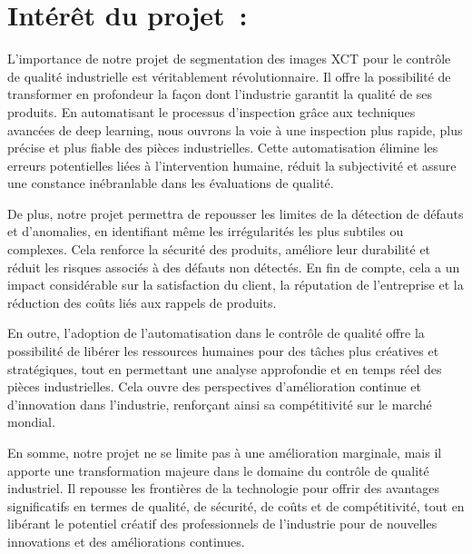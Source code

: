 \documentclass{report}
\newenvironment{mystyle}{
	\setlength{\parindent}{0pt} %
	\setlength{\parskip}{10pt} %
	\fontsize{12pt}{14pt}\selectfont %
}{
}
\begin{document}
		\section{Intérêt du projet :}
		\begin{mystyle}
			L'importance de notre projet de segmentation des images XCT pour le contrôle de qualité industrielle est véritablement révolutionnaire. Il offre la possibilité de transformer en profondeur la façon dont l'industrie garantit la qualité de ses produits. En automatisant le processus d'inspection grâce aux techniques avancées de deep learning, nous ouvrons la voie à une inspection plus rapide, plus précise et plus fiable des pièces industrielles. Cette automatisation élimine les erreurs potentielles liées à l'intervention humaine, réduit la subjectivité et assure une constance inébranlable dans les évaluations de qualité.
			
			De plus, notre projet permettra de repousser les limites de la détection de défauts et d'anomalies, en identifiant même les irrégularités les plus subtiles ou complexes. Cela renforce la sécurité des produits, améliore leur durabilité et réduit les risques associés à des défauts non détectés. En fin de compte, cela a un impact considérable sur la satisfaction du client, la réputation de l'entreprise et la réduction des coûts liés aux rappels de produits.
			
			En outre, l'adoption de l'automatisation dans le contrôle de qualité offre la possibilité de libérer les ressources humaines pour des tâches plus créatives et stratégiques, tout en permettant une analyse approfondie et en temps réel des pièces industrielles. Cela ouvre des perspectives d'amélioration continue et d'innovation dans l'industrie, renforçant ainsi sa compétitivité sur le marché mondial.
			
			En somme, notre projet ne se limite pas à une amélioration marginale, mais il apporte une transformation majeure dans le domaine du contrôle de qualité industriel. Il repousse les frontières de la technologie pour offrir des avantages significatifs en termes de qualité, de sécurité, de coûts et de compétitivité, tout en libérant le potentiel créatif des professionnels de l'industrie pour de nouvelles innovations et des améliorations continues.
	\end{mystyle}
	
\end{document}
